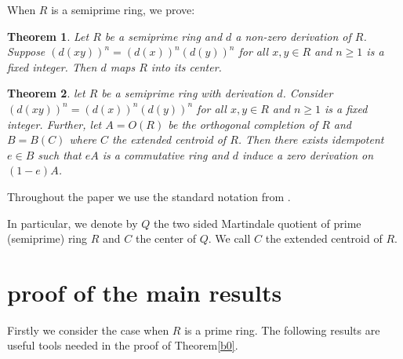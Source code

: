 \documentclass[12pt]{amsart}
\newtheorem{thm}{Theorem}[section]
\theoremstyle{definition}
\theoremstyle{remark}
\begin{document}
 \noindent
 When $R$ is a semiprime ring, we  prove:

 \begin{thm}\label{b00}
  Let $R$ be a   semiprime ring and $d$
  a non-zero derivation of $R$.
  Suppose $(d(xy))^n=(d(x))^n(d(y))^n$ for all
  $x, y \in R$ and $n\geq 1$ is a fixed integer.
  Then $d$ maps $R$ into its center.
  \end{thm}
  \begin{thm}\label{b000}
 let $R$ be a  semiprime ring with
 derivation $d$.  Consider
 $(d(xy))^n=(d(x))^n(d(y))^n$ for all
 $x, y \in R$ and $n\geq 1$ is a fixed integer.
 Further, let $A=O(R)$ be the orthogonal completion
 of $R$ and $B=B(C)$ where $C$ the extended centroid
 of $R$. Then there exists idempotent $e\in B$ such
 that $eA$ is a commutative ring and $d$ induce a
 zero derivation on $(1-e)A$.
 \end{thm}
 \noindent
 Throughout the paper we use the standard notation
 from \cite{a0}.

 \noindent
 In particular, we denote by  $Q$
 the two sided Martindale quotient of prime (semiprime) ring $R$
 and $C$ the center of $Q$. We call $C$ the extended centroid
 of $R$.\\

\section{proof of the main results}
 Firstly we consider the case when $R$ is a prime
 ring.
 The following results are useful tools
 needed in the proof of Theorem\ref{b0}.
\end{document}
